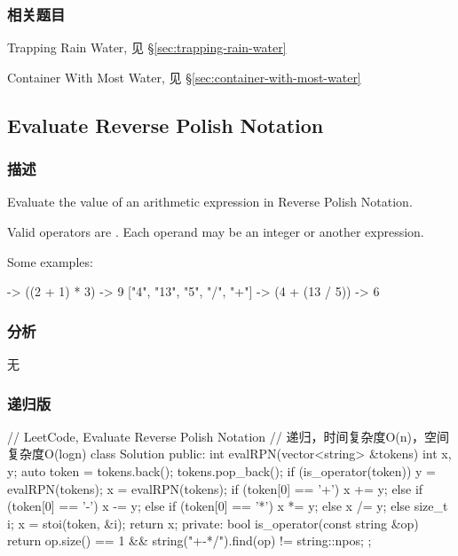 \subsubsection{相关题目}
\begindot
\item Trapping Rain Water, 见 \S \ref{sec:trapping-rain-water}
\item Container With Most Water, 见 \S \ref{sec:container-with-most-water}
\myenddot


\subsection{Evaluate Reverse Polish Notation} %
\label{sec:Evaluate-Reverse-Polish-Notation}


\subsubsection{描述}
Evaluate the value of an arithmetic expression in Reverse Polish Notation.

Valid operators are \fn{+, -, *, /}. Each operand may be an integer or another expression.

Some examples:
\begin{Code}
  ["2", "1", "+", "3", "*"] -> ((2 + 1) * 3) -> 9
  ["4", "13", "5", "/", "+"] -> (4 + (13 / 5)) -> 6
\end{Code}


\subsubsection{分析}
无


\subsubsection{递归版}
\begin{Code}
// LeetCode, Evaluate Reverse Polish Notation
// 递归，时间复杂度O(n)，空间复杂度O(logn)
class Solution {
public:
    int evalRPN(vector<string> &tokens) {
        int x, y;
        auto token = tokens.back();  tokens.pop_back();
        if (is_operator(token))  {
            y = evalRPN(tokens);
            x = evalRPN(tokens);
            if (token[0] == '+')       x += y;
            else if (token[0] == '-')  x -= y;
            else if (token[0] == '*')  x *= y;
            else                       x /= y;
        } else  {
            size_t i;
            x = stoi(token, &i);
        }
        return x;
    }
private:
    bool is_operator(const string &op) {
        return op.size() == 1 && string("+-*/").find(op) != string::npos;
    }
};
\end{Code}



